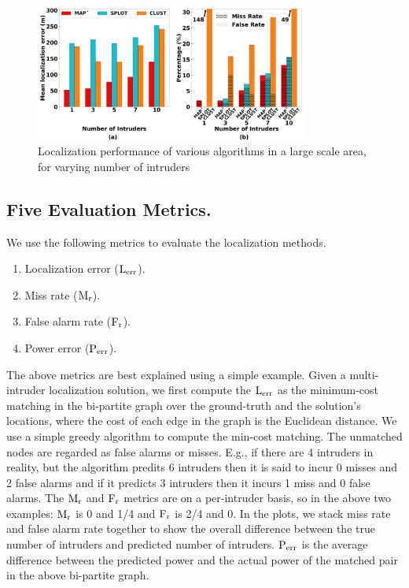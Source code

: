 \begin{figure}[ht]
	\centering
	\includegraphics[width=0.8\textwidth]{chapters/ipsn/figures/splat-vary-numintru.png}
	\caption{Localization performance of various algorithms in a large scale area, for varying number of intruders}
	\label{fig:varying-num-intruders}
\end{figure}

\subsection{Five Evaluation Metrics.}
We use the following metrics to evaluate the localization methods. 
\begin{enumerate}
\item Localization error ($\mathrm{L_{err}}$). 
\item Miss rate ($\mathrm{M_{r}}$).
\item False alarm rate ($\mathrm{F_{r}}$).
\item Power error ($\mathrm{P_{err}}$).
\end{enumerate}
The above metrics are best explained using a simple example. Given a
multi-intruder localization solution, we first compute the $\mathrm{L_{err}}$ as
the minimum-cost matching in the bi-partite graph over the
ground-truth and the solution's locations, where the cost of each edge
in the graph is the Euclidean distance. We use a simple greedy
algorithm to compute the min-cost matching.
The unmatched nodes are regarded as false alarms or misses. E.g., if
there are 4 intruders in reality, but the algorithm predits 6
intruders then it is said to incur 0 misses and 2 false alarms and if
it predicts 3 intruders then it incurs 1 miss and 0 false alarms. The
$\mathrm{M_{r}}$ and $\mathrm{F_{r}}$ metrics are on a per-intruder basis, so in the above
two examples: $\mathrm{M_{r}}$ is 0 and 1/4 and $\mathrm{F_{r}}$ is 2/4 and 0. In the plots, we stack miss rate and false alarm rate together to show the overall difference between the true number of intruders and predicted number of intruders.
$\mathrm{P_{err}}$ is the average difference between the predicted power
and the actual power of the matched pair in the above bi-partite
graph. 

